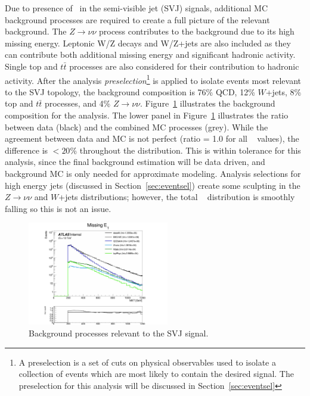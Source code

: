 Due to presence of \met~in the semi-visible jet (SVJ) signals, additional MC background processes are required to create a full picture of the relevant background. 
The $Z\rightarrow \nu\nu$ process contributes to the background due to its high missing energy. 
Leptonic W/Z decays and W/Z+jets are also included as they can contribute both additional missing energy and significant hadronic activity.
Single top and $t\bar{t}$ processes are also considered for their contribution to hadronic activity.
After the analysis \textit{preselection}\footnote{A preselection is a set of cuts on physical observables used to isolate a collection of events which are most likely to contain the desired signal. The preselection for this analysis will be discussed in Section~\ref{sec:eventsel}} is applied to isolate events most relevant to the SVJ topology, the background composition is 76\% QCD, 12\% $W$+jets, 8\% top and $t\bar{t}$ processes, and 4\% $Z\rightarrow \nu\nu$.  
Figure~\ref{fig:bkg_mc} illustrates the background composition for the analysis.
The lower panel in Figure~\ref{fig:bkg_mc} illustrates the ratio between data (black) and the combined MC processes (grey).
While the agreement between data and MC is not perfect (ratio = 1.0 for all \met~ values), the difference is $<20$\% throughout the distribution.
This is within tolerance for this analysis, since the final background estimation will be data driven, and background MC is only needed for approximate modeling.
Analysis selections for high energy jets (discussed in Section~\ref{sec:eventsel}) create some sculpting in the $Z\rightarrow \nu\nu$ and $W$+jets distributions; however, the total \met~ distribution is smoothly falling so this is not an issue.

\begin{figure}
        \centering
	\includegraphics[width=0.55\textwidth]{figures/ch6/bkg_mc}
	\caption{Background processes relevant to the SVJ signal. 
	\label{fig:bkg_mc}}
\end{figure}

